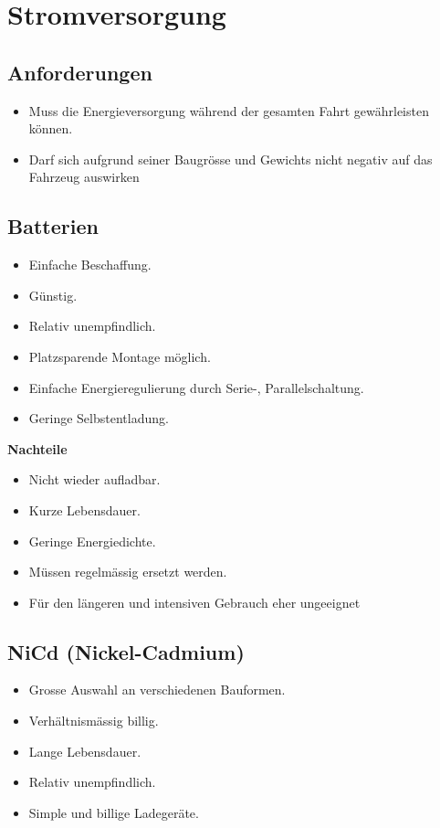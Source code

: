 \section{Stromversorgung}

\subsection {Anforderungen}
\begin{itemize}
\item Muss die Energieversorgung während der gesamten Fahrt gewährleisten können.
\item Darf sich aufgrund seiner Baugrösse und Gewichts nicht negativ auf das Fahrzeug auswirken
\end{itemize}

\subsection {Batterien}

\begin{itemize}
\item Einfache Beschaffung.
\item Günstig.
\item Relativ unempfindlich.
\item Platzsparende Montage möglich.
\item Einfache Energieregulierung durch Serie-, Parallelschaltung.
\item Geringe Selbstentladung.
\end{itemize}

\textbf {Nachteile}
\begin{itemize}
\item Nicht wieder aufladbar. 
\item Kurze Lebensdauer.	
\item Geringe Energiedichte.
\item Müssen regelmässig ersetzt werden.
\item Für den längeren und intensiven Gebrauch eher ungeeignet
\end{itemize}

\subsection {NiCd (Nickel-Cadmium)}

\begin{itemize}
\item Grosse Auswahl an verschiedenen Bauformen.
\item Verhältnismässig billig.
\item Lange Lebensdauer.
\item Relativ unempfindlich.
\item Simple und billige Ladegeräte.
\end{itemize}

